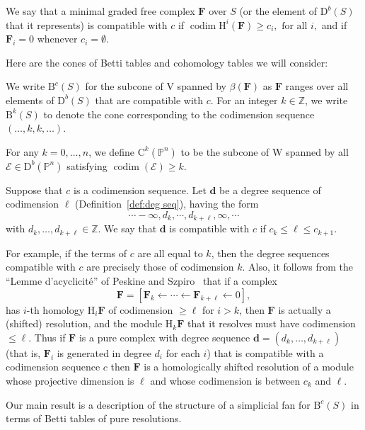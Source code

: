 \documentclass[12pt]{amsart}
\theoremstyle{definition}
\theoremstyle{remark}
\newtheorem{defn}[lemma]{Definition}
\newcommand{\codim}{\operatorname{codim}}
\newcommand{\PP}{\mathbb{P}}
\newcommand{\HH}{\mathrm{H}}
\newcommand{\ZZ}{\mathbb{Z}}
\newcommand{\VV}{\mathrm{V}}
\newcommand{\WW}{\mathrm{W}}
\newcommand{\cc}{c}
\newcommand{\dd}{\mathbf{d}}
\newcommand{\cE}{\mathcal{E}}
\newcommand{\FF}{\mathbf{F}}
\newcommand{\defi}[1]{\textsf{#1}} %
\newcommand{\nothing}{\emptyset}
\newcommand{\DD}{\mathrm{D}}
\newcommand{\CQ}{\mathrm{C}}
\newcommand{\BBQ}{\mathrm{B}}
\newcommand{\daniel}[1]{{\color{green} \sf $\clubsuit\clubsuit\clubsuit$ Daniel: [#1]}}
\begin{document}
We say that a
minimal graded free complex $\FF$ over $S$ (or the element of $\DD^{b}(S)$ that it represents) is \defi{compatible with $\cc$} if 
$
\codim \HH^i(\FF) \geq c_i, \text{ for all } i,
$
and if $\FF_i=0$ whenever $c_i=\nothing$.


Here are the cones of Betti tables and cohomology tables we will consider:

We write $\BBQ^{\cc}(S)$ for the subcone of $\VV$ spanned by $\beta(\FF)$ as $\FF$ ranges over all elements of $\DD^b(S)$ that are compatible with $\cc$.  For an integer $k\in \ZZ$, we write $\BBQ^k(S)$ to denote the cone corresponding to the codimension sequence $(\dots, k,k,\dots)$.

For any $k=0, \dots, n$, we define $\CQ^k(\PP^n)$ to be the subcone of $\WW$ spanned by all $\cE\in \DD^b(\PP^n)$ satisfying $\codim(\cE)\geq k$.

Suppose that $\cc$ is a codimension sequence. Let $\dd$ be a degree sequence 
of codimension $\ell$ (Definition~\ref{def:deg seq}), having the form
$$
\cdots -\infty, d_{k}, \cdots, d_{k+\ell}, \infty, \cdots
$$
with $d_{k},\dots, d_{k+\ell}\in \ZZ$.
We say that $\dd$ is \defi{compatible} with $\cc$ if $c_{k}\leq \ell \leq c_{k+1}$. 

For example, if the terms of $\cc$ are all equal to $k$, then the degree sequences
compatible with $\cc$ are precisely those of codimension $k$.
Also, it follows from the ``Lemme d'acyclicit\'e'' of Peskine and Szpiro~\cite{MR0374130}
that if a complex
$$
\FF= [\FF_{k}\leftarrow \cdots \leftarrow \FF_{k+\ell}\leftarrow 0],
$$
has $i$-th homology $\HH_{i}\FF$ of codimension $\geq\ell$ for $i>k$, then $\FF$ is actually a (shifted) resolution, and the module $\HH_{k}\FF$ that it resolves must have codimension $\leq \ell$. Thus if $\FF$ is a pure complex with degree sequence $\dd = (d_{k}, \dots,d_{k+\ell})$ (that is,   $\FF_{i}$ is generated in degree $d_{i}$ for each $i$) that is compatible with a codimension sequence $\cc$
then
$\FF$ is a homologically shifted resolution of a module whose projective dimension is $\ell$ and whose codimension is between
$c_{k}$ and $\ell$. 

Our main result is a description of the structure of a simplicial fan for $\BBQ^{\cc}(S)$ in terms of  Betti tables of pure resolutions.  
\end{document}
